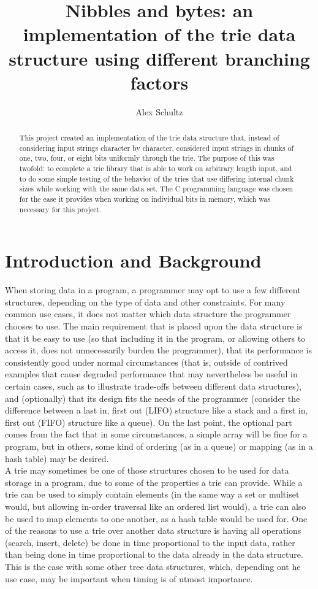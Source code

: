 \documentclass{llncs}
\title{Nibbles and bytes: an implementation of the trie data structure using different branching factors}
\author{Alex Schultz}
\institute{Tufts University}
\begin{document}
\maketitle

\begin{abstract}
This project created an implementation of the trie data structure that, instead of considering input strings character by character, considered input strings in chunks of one, two, four, or eight bits uniformly through the trie. The purpose of this was twofold: to complete a trie library that is able to work on arbitrary length input, and to do some simple testing of the behavior of the tries that use differing internal chunk sizes while working with the same data set. The C programming language was chosen for the ease it provides when working on individual bits in memory, which was necessary for this project.
\end{abstract}

\section{Introduction and Background}
\label{Introduction and Background}
When storing data in a program, a programmer may opt to use a few different structures, depending on the type of data and other constraints. For many common use cases, it does not matter which data structure the programmer chooses to use. The main requirement that is placed upon the data structure is that it be easy to use (so that including it in the program, or allowing others to access it, does not unnecessarily burden the programmer), that its performance is consistently good under normal circumstances (that is, outside of contrived examples that cause degraded performance that may nevertheless be useful in certain cases, such as to illustrate trade-offs between different data structures), and (optionally) that its design fits the needs of the programmer (consider the difference between a last in, first out (LIFO) structure like a stack and a first in, first out (FIFO) structure like a queue). On the last point, the optional part comes from the fact that in some circumstances, a simple array will be fine for a program, but in others, some kind of ordering (as in a queue) or mapping (as in a hash table) may be desired. \\

A trie may sometimes be one of those structures chosen to be used for data storage in a program, due to some of the properties a trie can provide. While a trie can be used to simply contain elements (in the same way a set or multiset would, but allowing in-order traversal like an ordered list would), a trie can also be used to map elements to one another, as a hash table would be used for. One of the reasons to use a trie over another data structure is having all operations (search, insert, delete) be done in time proportional to the input data, rather than being done in time proportional to the data already in the data structure. This is the case with some other tree data structures, which, depending ont he use case, may be important when timing is of utmost importance. \\
\end{document}
